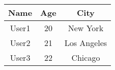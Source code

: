 \documentclass{article}
\begin{document}
\begin{tabular}{|c|c|c|}
\hline
Name & Age & City \\
\hline
User1 & 20 & New York \\
\hline
User2 & 21 & Los Angeles \\
\hline
User3 & 22 & Chicago \\
\hline
\end{tabular}
\end{document}
